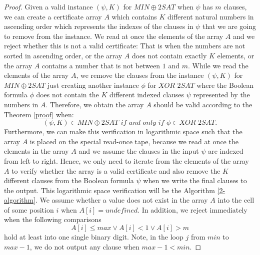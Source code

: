 \documentclass[a4paper,UKenglish,cleveref, autoref]{lipics-v2019}
\begin{document}
\begin{proof}
Given a valid instance $(\psi, K)$ for $MIN\oplus2SAT$ when $\psi$ has $m$ clauses, we can create a certificate array $A$ which contains $K$ different natural numbers in ascending order which represents the indexes of the clauses in $\psi$ that we are going to remove from the instance. We read at once the elements of the array $A$ and we reject whether this is not a valid certificate: That is when the numbers are not sorted in ascending order, or the array $A$ does not contain exactly $K$ elements, or the array $A$ contains a number that is not between $1$ and $m$. While we read the elements of the array $A$, we remove the clauses from the instance $(\psi, K)$ for $MIN\oplus2SAT$ just creating another instance $\phi$ for $\textit{XOR 2SAT}$ where the Boolean formula $\phi$ does not contain the $K$ different indexed clauses $\psi$ represented by the numbers in $A$. Therefore, we obtain the array $A$ should be valid according to the Theorem \ref{proof} when:
\[(\psi, K) \in MIN\oplus2SAT \textit{ if and only if } \phi \in \textit{XOR 2SAT}.\]
Furthermore, we can make this verification in logarithmic space such that the array $A$ is placed on the special read-once tape, because we read at once the elements in the array $A$ and we assume the clauses in the input $\psi$ are indexed from left to right. Hence, we only need to iterate from the elements of the array $A$ to verify whether the array is a valid certificate and also remove the $K$ different clauses from the Boolean formula $\psi$ when we write the final clauses to the output. This logarithmic space verification will be the Algorithm \ref{2-algorithm}. We assume whether a value does not exist in the array $A$ into the cell of some position $i$ when $A[i] = undefined$. In addition, we reject immediately when the following comparisons
\[A[i] \leq max \vee A[i] < 1 \vee A[i] > m\]
hold at least into one single binary digit. Note, in the loop $j$ from $min$ to $max - 1$, we do not output any clause when $max - 1 < min$.


\end{proof}
\end{document}
